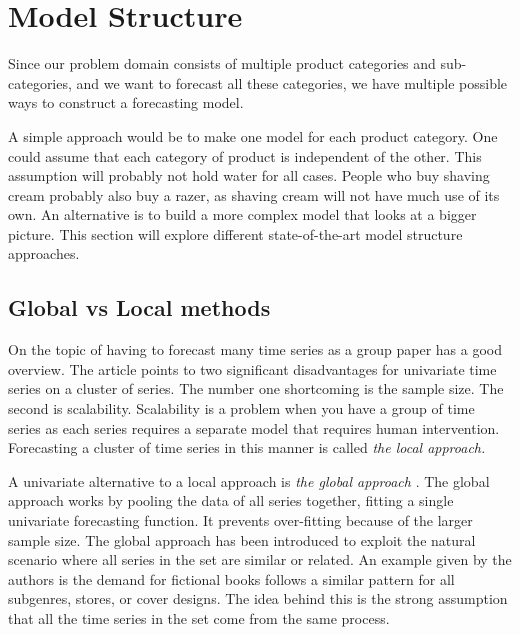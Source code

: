 \section{Model Structure}
\label{section:RelatedWork:Model-structure}
Since our problem domain consists of multiple product categories and sub-categories,
and we want to forecast all these categories,
we have multiple possible ways to construct a forecasting model.

A simple approach would be to make one model for each product category.
One could assume that each category of product is independent of the other.
This assumption will probably not hold water for all cases. People who buy shaving cream probably also buy a razer, as shaving cream will not have much use of its own.
An alternative is to build a more complex model that looks at a bigger picture.
This section will explore different state-of-the-art model structure approaches.




\subsection{Global vs Local methods}
On the topic of having to forecast many time series as a group \cite{Montero-Manso2021} paper has a good overview.
The article points to two significant disadvantages for univariate time series on a cluster of series.
The number one shortcoming is the sample size. The second is scalability.
Scalability is a problem when you have a group of time series as each series requires a separate model
that requires human intervention. Forecasting a cluster of time series in this manner is called
\textit{the local approach.}

A univariate alternative to a local approach is \textit{the global approach}
\citep{Rabanser2020}.
The global approach works by pooling the data of all series together, fitting a single univariate forecasting function. It prevents over-fitting because of the larger sample size.
The global approach has been introduced to exploit the natural scenario where all series
in the set are similar or related. An example given by the authors is the demand for fictional
books follows a similar pattern for all subgenres, stores, or cover designs.
The idea behind this is the strong assumption that all the time series in the set
come from the same process.

